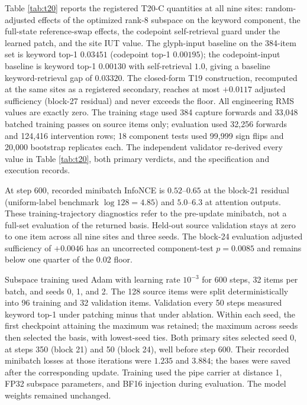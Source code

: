 \documentclass{article}
\begin{document}
Table \ref{tab:t20} reports the registered T20-C quantities at all nine
sites: random-adjusted effects of the optimized rank-8 subspace on the
keyword component, the full-state reference-swap effects, the codepoint
self-retrieval guard under the learned patch, and the site IUT value. The
glyph-input baseline on the 384-item set is keyword top-1 $0.03451$
(codepoint top-1 $0.00195$); the codepoint-input baseline is keyword top-1
$0.00130$ with self-retrieval $1.0$, giving a baseline keyword-retrieval gap of
$0.03320$. The closed-form T19 construction, recomputed at the same sites as
a registered secondary, reaches at most $+0.0117$ adjusted sufficiency
(block-27 residual) and never exceeds the floor. All engineering RMS values
are exactly zero. The training stage used 384 capture forwards and 33,048
batched training passes on source items only; evaluation used 32,256 forwards
and 124,416 intervention rows; 18 component tests used 99,999 sign flips and
20,000 bootstrap replicates each. The independent validator re-derived every
value in Table \ref{tab:t20}, both primary verdicts, and the specification
and execution records.

At step 600, recorded minibatch InfoNCE is $0.52$--$0.65$ at the block-21
residual (uniform-label benchmark $\log 128=4.85$) and $5.0$--$6.3$ at
attention outputs. These training-trajectory diagnostics refer to the
pre-update minibatch, not a full-set evaluation of the returned basis.
Held-out source validation stays at zero to one item across all nine sites
and three seeds.
The block-24 evaluation adjusted sufficiency of $+0.0046$ has an uncorrected
component-test $p=0.0085$ and remains below one quarter of the $0.02$ floor.

Subspace training used Adam with learning rate $10^{-3}$ for 600 steps,
32 items per batch, and seeds 0, 1, and 2. The 128 source items were split
deterministically into 96 training and 32 validation items. Validation every
50 steps measured keyword top-1 under patching minus that under ablation.
Within each seed, the first checkpoint attaining the maximum was retained;
the maximum across seeds then selected the basis, with lowest-seed ties.
Both primary sites selected seed 0, at steps 350 (block 21) and 50 (block 24),
well before step 600. Their recorded minibatch losses at those iterations
were $1.235$ and $3.884$; the bases were saved after the corresponding update.
Training used the pipe carrier at distance 1,
FP32 subspace parameters, and BF16 injection during evaluation. The model
weights remained unchanged.
\end{document}
